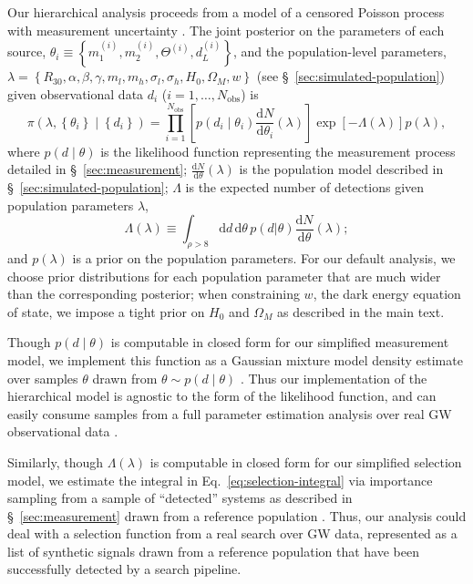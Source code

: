 \documentclass[modern]{aastex62}
\newcommand{\dd}{\mathrm{d}}
\newcommand{\diff}[2]{\frac{\dd #1}{\dd #2}}
\begin{document}
Our hierarchical analysis proceeds from a model of a censored Poisson process
with measurement uncertainty \citep{Loredo2004,Mandel2019}.  The joint posterior
on the parameters of each source, $\theta_i \equiv \left\{ m_1^{(i)}, m_2^{(i)},
\Theta^{(i)}, d_L^{(i)} \right\}$, and the population-level parameters, $\lambda
= \left\{ R_{30}, \alpha, \beta, \gamma, m_l, m_h, \sigma_l, \sigma_h, H_0,
\Omega_M, w \right\}$ (see \S\ \ref{sec:simulated-population}) given
observational data $d_i$ ($i = 1, \ldots, N_\mathrm{obs}$) is
%
\begin{equation}
  \label{eq:hierarchical-model}
  \pi \left( \lambda, \left\{ \theta_i \right\} \mid \left\{ d_i \right\} \right) = \prod_{i=1}^{N_\mathrm{obs}} \left[ p\left( d_i \mid \theta_i \right) \diff{N}{\theta_i}(\lambda) \right] \exp\left[ - \Lambda(\lambda) \right] p\left( \lambda \right),
\end{equation}
%
where $p\left( d \mid \theta \right)$ is the likelihood function representing
the measurement process detailed in \S\ \ref{sec:measurement};
$\diff{N}{\theta}(\lambda)$ is the population model described in \S\
\ref{sec:simulated-population}; $\Lambda$ is the expected number of detections
given population parameters $\lambda$,
%
\begin{equation}
  \label{eq:selection-integral}
  \Lambda(\lambda) \equiv \int_{\rho > 8} \dd d \, \dd \theta \, p\left( d | \theta \right) \diff{N}{\theta}\left(\lambda \right);
\end{equation}
%
and $p(\lambda)$ is a prior on the population parameters.  For our default
analysis, we choose prior distributions for each population parameter that are
much wider than the corresponding posterior; when constraining $w$, the dark
energy equation of state, we impose a tight prior on $H_0$ and $\Omega_M$ as
described in the main text.

Though $p\left( d \mid \theta \right)$ is computable in closed form for our
simplified measurement model, we implement this function as a Gaussian mixture
model density estimate over samples $\theta$ drawn from $\theta \sim p\left( d
\mid \theta \right)$ \citep{SciKitLearn}.  Thus our implementation of the
hierarchical model is agnostic to the form of the likelihood function, and can
easily consume samples from a full parameter estimation analysis over real
\ac{GW} observational data \citep{GWTC-1}. 

Similarly, though $\Lambda(\lambda)$ is computable in closed form for our
simplified selection model, we estimate the integral in Eq.\
\eqref{eq:selection-integral} via importance sampling from a sample of
``detected'' systems as described in \S\ \ref{sec:measurement} drawn from a
reference population \citep{Farr2019}.  Thus, our analysis could deal with a
selection function from a real search over \ac{GW} data, represented as a list
of synthetic signals drawn from a reference population that have been
successfully detected by a search pipeline.
\end{document}
